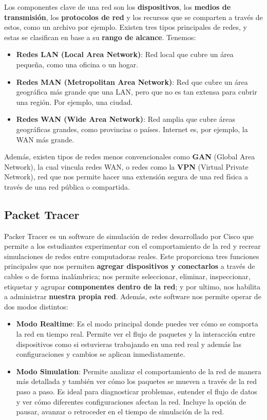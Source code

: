 \documentclass{article}
\begin{document}
Los componentes clave de una red son los \textbf{dispositivos}, los \textbf{medios de transmisión}, los \textbf{protocolos de red} y los recursos que se comparten a través de estos, como un archivo por ejemplo. Existen tres tipos principales de redes, y estas se clasifican en base a su \textbf{rango de alcance}. Tenemos: 

\begin{itemize}
    \item \textbf{Redes LAN (Local Area Network)}: Red local que cubre un área pequeña, como una oficina o un hogar.
    \item \textbf{Redes MAN (Metropolitan Area Network)}: Red que cubre un área geográfica más grande que una LAN, pero que no es tan extensa para cubrir una región. Por ejemplo, una ciudad.
    \item \textbf{Redes WAN (Wide Area Network)}: Red amplia que cubre áreas geográficas grandes, como provincias o países. Internet es, por ejemplo, la WAN más grande.
\end{itemize}

Además, existen tipos de redes menos convencionales como \textbf{GAN} (Global Area Network), la cual vincula redes WAN, o redes como la \textbf{VPN} (Virtual Private Network), red que nos permite hacer una extensión segura de una red física a través de una red pública o compartida. 


\subsection{Packet Tracer}
Packer Tracer es un software de simulación de redes desarrollado por Cisco que permite a los estudiantes experimentar con el comportamiento de la red y recrear simulaciones de redes entre computadoras reales.
Este proporciona tres funciones principales que nos permiten \textbf{agregar dispositivos y conectarlos} a través de cables o de forma inalámbrica; nos permite seleccionar, eliminar, inspeccionar, etiquetar y agrupar \textbf{componentes dentro de la red}; y por ultimo, nos habilita a administrar \textbf{nuestra propia red}. Además, este software nos permite operar de dos modos distintos: 

\begin{itemize}
    \item \textbf{Modo Realtime}: Es el modo principal donde puedes ver cómo se comporta la red en tiempo real. Permite ver el flujo de paquetes y la interacción entre dispositivos como si estuvieras trabajando en una red real y además las configuraciones y cambios se aplican inmediatamente.
    \item \textbf{Modo Simulation}: Permite analizar el comportamiento de la red de manera más detallada y también ver cómo los paquetes se mueven a través de la red paso a paso. Es ideal para diagnosticar problemas, entender el flujo de datos y ver cómo diferentes configuraciones afectan la red. Incluye la opción de pausar, avanzar o retroceder en el tiempo de simulación de la red.
\end{itemize}
\end{document}
